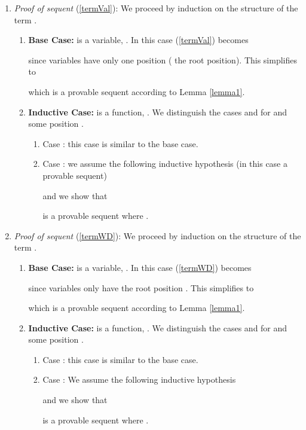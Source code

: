 \documentclass[copyright]{eptcs}
\begin{document}
\begin{enumerate}
\item \textit{Proof of sequent} (\ref{termVal}): We proceed by induction on the structure of the term .
\begin{enumerate}
\item \textbf{Base Case:}  is a variable, . In this case (\ref{termVal}) becomes

since variables have only one position ( the root position). This simplifies to 

which is a provable sequent according to Lemma \ref{lemma1}.
\item \textbf{Inductive Case:}  is a function, . We distinguish the cases  and  for  and some position .
\begin{enumerate}
\item Case : this case is similar to the base case.
\item Case : we assume the following inductive hypothesis (in this case a provable sequent)

and we show that
\begin{small}

\end{small}
is a provable sequent where .
\end{enumerate}
\end{enumerate}
\item \textit{Proof of sequent} (\ref{termWD}): We proceed by induction on the structure of the term .
\begin{enumerate}
\item \textbf{Base Case:}  is a variable, . In this case (\ref{termWD}) becomes

since variables only have the root position . This simplifies to 

which is a provable sequent according to Lemma \ref{lemma1}.
\item \textbf{Inductive Case:}  is a function, . We distinguish the cases  and  for  and some position .
\begin{enumerate}
\item Case : this case is similar to the base case.
\item Case : We assume the following inductive hypothesis

and we show that
\begin{small}

\end{small}
is a provable sequent where .
\end{enumerate}
\end{enumerate}
\end{enumerate}
\end{document}
